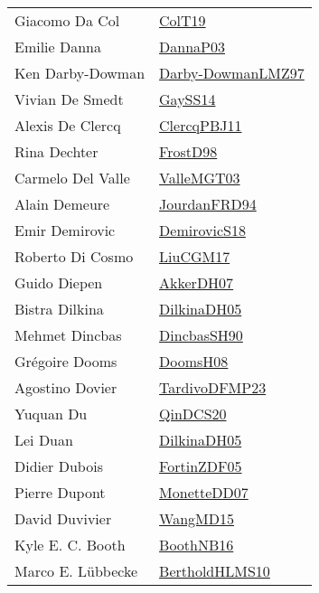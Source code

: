 {\begin{longtable}{p{4cm}p{20cm}}
Giacomo Da Col & \href{papers/ColT19.pdf}{ColT19}\cite{ColT19} \\
Emilie Danna & \href{papers/DannaP03.pdf}{DannaP03}\cite{DannaP03} \\
Ken Darby{-}Dowman & \href{articles/Darby-DowmanLMZ97.pdf}{Darby-DowmanLMZ97}\cite{Darby-DowmanLMZ97} \\
Vivian De Smedt & \href{papers/GaySS14.pdf}{GaySS14}\cite{GaySS14} \\
Alexis De Clercq & \href{papers/ClercqPBJ11.pdf}{ClercqPBJ11}\cite{ClercqPBJ11} \\
Rina Dechter & \href{papers/FrostD98.pdf}{FrostD98}\cite{FrostD98} \\
Carmelo Del Valle & \href{papers/ValleMGT03.pdf}{ValleMGT03}\cite{ValleMGT03} \\
Alain Demeure & \href{}{JourdanFRD94}\cite{JourdanFRD94} \\
Emir Demirovic & \href{papers/DemirovicS18.pdf}{DemirovicS18}\cite{DemirovicS18} \\
Roberto Di Cosmo & \href{papers/LiuCGM17.pdf}{LiuCGM17}\cite{LiuCGM17} \\
Guido Diepen & \href{papers/AkkerDH07.pdf}{AkkerDH07}\cite{AkkerDH07} \\
Bistra Dilkina & \href{papers/DilkinaDH05.pdf}{DilkinaDH05}\cite{DilkinaDH05} \\
Mehmet Dincbas & \href{articles/DincbasSH90.pdf}{DincbasSH90}\cite{DincbasSH90} \\
Gr{\'{e}}goire Dooms & \href{papers/DoomsH08.pdf}{DoomsH08}\cite{DoomsH08} \\
Agostino Dovier & \href{papers/TardivoDFMP23.pdf}{TardivoDFMP23}\cite{TardivoDFMP23} \\
Yuquan Du & \href{articles/QinDCS20.pdf}{QinDCS20}\cite{QinDCS20} \\
Lei Duan & \href{papers/DilkinaDH05.pdf}{DilkinaDH05}\cite{DilkinaDH05} \\
Didier Dubois & \href{papers/FortinZDF05.pdf}{FortinZDF05}\cite{FortinZDF05} \\
Pierre Dupont & \href{papers/MonetteDD07.pdf}{MonetteDD07}\cite{MonetteDD07} \\
David Duvivier & \href{articles/WangMD15.pdf}{WangMD15}\cite{WangMD15} \\
Kyle E. C. Booth & \href{papers/BoothNB16.pdf}{BoothNB16}\cite{BoothNB16} \\
Marco E. L{\"{u}}bbecke & \href{papers/BertholdHLMS10.pdf}{BertholdHLMS10}\cite{BertholdHLMS10} \\

\end{longtable}}

